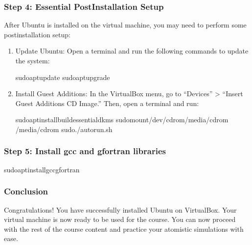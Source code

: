 \documentclass[letterpaper,10pt,english]{sphinxmanual}
\begin{document}
\subsubsection{Step 4: Essential Post\sphinxhyphen{}Installation Setup}
\label{\detokenize{vbox/vbox:step-4-essential-post-installation-setup}}
\sphinxAtStartPar
After Ubuntu is installed on the virtual machine, you may need to perform some post\sphinxhyphen{}installation setup:
\begin{enumerate}
%
\item {} 
\sphinxAtStartPar
Update Ubuntu: Open a terminal and run the following commands to update the system:

\begin{sphinxVerbatim}[commandchars=\\\{\}]
sudoaptupdate
sudoaptupgrade
\end{sphinxVerbatim}

\item {} 
\sphinxAtStartPar
Install Guest Additions: In the VirtualBox menu, go to “Devices” \sphinxhyphen{}\textgreater{} “Insert Guest Additions CD Image.” Then, open a terminal and run:

\begin{sphinxVerbatim}[commandchars=\\\{\}]
sudoaptinstallbuild\PYGZhy{}essentialdkms
sudomount/dev/cdrom/media/cdrom
/media/cdrom
sudo./autorun.sh
\end{sphinxVerbatim}

\end{enumerate}


\subsubsection{Step 5: Install gcc and gfortran libraries}
\label{\detokenize{vbox/vbox:step-5-install-gcc-and-gfortran-libraries}}
\begin{sphinxVerbatim}[commandchars=\\\{\}]
sudoaptinstallgccgfortran
\end{sphinxVerbatim}


\subsubsection{Conclusion}
\label{\detokenize{vbox/vbox:conclusion}}
\sphinxAtStartPar
Congratulations! You have successfully installed Ubuntu on VirtualBox. Your virtual machine is now ready to be used for the course. You can now proceed with the rest of the course content and practice your atomistic simulations with ease.
\end{document}
